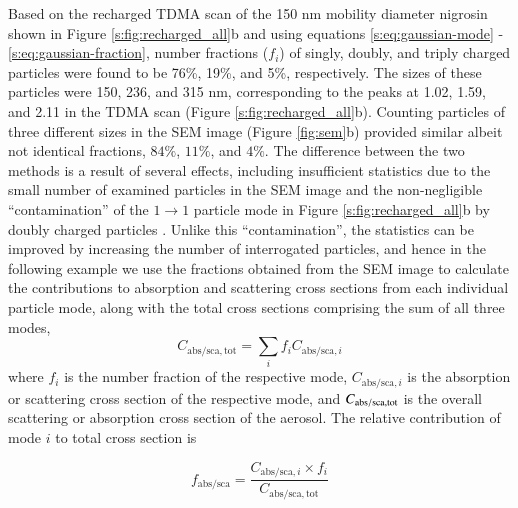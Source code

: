 Based on the recharged TDMA scan of the 150 nm mobility diameter nigrosin  shown in Figure \ref{s:fig:recharged_all}b and using equations \ref{s:eq:gaussian-mode} - \ref{s:eq:gaussian-fraction}, number fractions ($f_i$) of singly, doubly, and triply charged particles were found to be 76\%, 19\%, and 5\%, respectively. The sizes of these particles were 150, 236, and 315 nm, corresponding to the peaks at 1.02, 1.59, and 2.11 in the TDMA scan (Figure \ref{s:fig:recharged_all}b). Counting particles of three different sizes in the SEM image (Figure \ref{fig:sem}b) provided similar albeit not identical fractions, $84\%$, $11\%$, and $4\%$. The difference between the two methods is a result of several effects, including insufficient statistics due to the small number of examined particles in the SEM image and the non-negligible ``contamination'' of the $1\rightarrow 1$ particle mode in Figure \ref{s:fig:recharged_all}b by doubly charged particles \citep{RN7}. Unlike this ``contamination'', the statistics can be improved by increasing the number of interrogated particles, and hence in the following example we use the fractions obtained from the SEM image to calculate the contributions to absorption and scattering cross sections from each individual particle mode, along with the total cross sections comprising the sum of all three modes,
\begin{equation}
    C_\mathrm{abs/sca,tot}=\sum_{i}{f_iC_{\mathrm{abs/sca},i}}
    \label{eq:total_corss_section}
\end{equation}
where $f_i$ is the number fraction of the respective mode, $C_{\mathrm{abs/sca},i}$ is the absorption or scattering cross section of the respective mode, and $C_{\rm abs/sca,tot}$ is the overall scattering or absorption cross section of the aerosol. The relative contribution of mode $i$ to total cross section is

\begin{equation}
    f_{\mathrm{abs/sca}}=\frac{C_{\mathrm{abs/sca},i}\times f_i}{C_\mathrm{abs/sca,tot}}
    \label{eq:contribution}
\end{equation}

